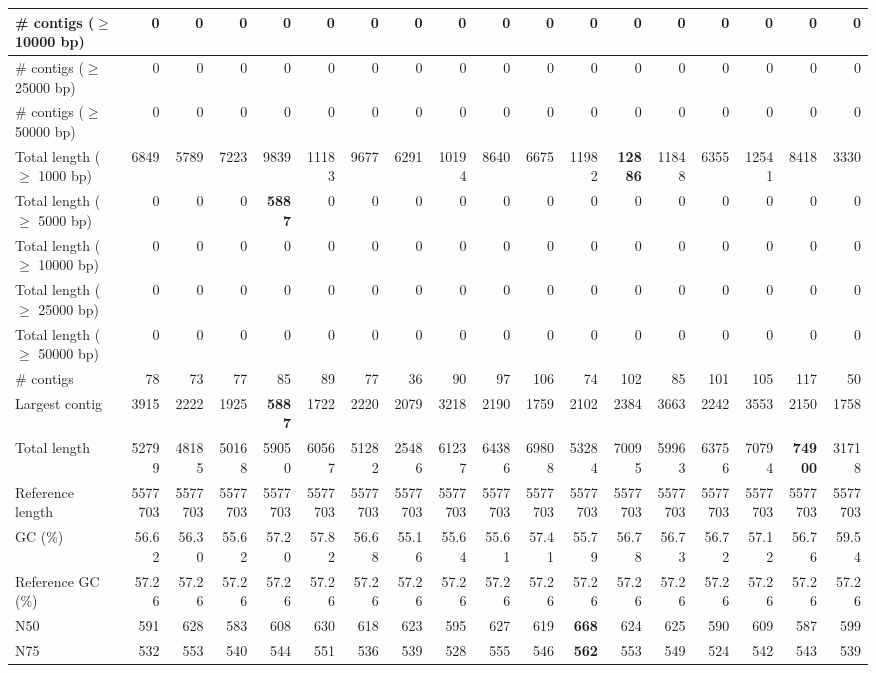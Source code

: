 \documentclass[12pt,a4paper]{article}
\begin{document}
\begin{table}[ht]
\begin{center}
\begin{tabular}{|l*{17}{|r}|}
\# contigs ($\geq$ 10000 bp) & 0 & 0 & 0 & 0 & 0 & 0 & 0 & 0 & 0 & 0 & 0 & 0 & 0 & 0 & 0 & 0 & 0 \\ \hline
\# contigs ($\geq$ 25000 bp) & 0 & 0 & 0 & 0 & 0 & 0 & 0 & 0 & 0 & 0 & 0 & 0 & 0 & 0 & 0 & 0 & 0 \\ \hline
\# contigs ($\geq$ 50000 bp) & 0 & 0 & 0 & 0 & 0 & 0 & 0 & 0 & 0 & 0 & 0 & 0 & 0 & 0 & 0 & 0 & 0 \\ \hline
Total length ($\geq$ 1000 bp) & 6849 & 5789 & 7223 & 9839 & 11183 & 9677 & 6291 & 10194 & 8640 & 6675 & 11982 & {\bf 12886} & 11848 & 6355 & 12541 & 8418 & 3330 \\ \hline
Total length ($\geq$ 5000 bp) & 0 & 0 & 0 & {\bf 5887} & 0 & 0 & 0 & 0 & 0 & 0 & 0 & 0 & 0 & 0 & 0 & 0 & 0 \\ \hline
Total length ($\geq$ 10000 bp) & 0 & 0 & 0 & 0 & 0 & 0 & 0 & 0 & 0 & 0 & 0 & 0 & 0 & 0 & 0 & 0 & 0 \\ \hline
Total length ($\geq$ 25000 bp) & 0 & 0 & 0 & 0 & 0 & 0 & 0 & 0 & 0 & 0 & 0 & 0 & 0 & 0 & 0 & 0 & 0 \\ \hline
Total length ($\geq$ 50000 bp) & 0 & 0 & 0 & 0 & 0 & 0 & 0 & 0 & 0 & 0 & 0 & 0 & 0 & 0 & 0 & 0 & 0 \\ \hline
\# contigs & 78 & 73 & 77 & 85 & 89 & 77 & 36 & 90 & 97 & 106 & 74 & 102 & 85 & 101 & 105 & 117 & 50 \\ \hline
Largest contig & 3915 & 2222 & 1925 & {\bf 5887} & 1722 & 2220 & 2079 & 3218 & 2190 & 1759 & 2102 & 2384 & 3663 & 2242 & 3553 & 2150 & 1758 \\ \hline
Total length & 52799 & 48185 & 50168 & 59050 & 60567 & 51282 & 25486 & 61237 & 64386 & 69808 & 53284 & 70095 & 59963 & 63756 & 70794 & {\bf 74900} & 31718 \\ \hline
Reference length & 5577703 & 5577703 & 5577703 & 5577703 & 5577703 & 5577703 & 5577703 & 5577703 & 5577703 & 5577703 & 5577703 & 5577703 & 5577703 & 5577703 & 5577703 & 5577703 & 5577703 \\ \hline
GC (\%) & 56.62 & 56.30 & 55.62 & 57.20 & 57.82 & 56.68 & 55.16 & 55.64 & 55.61 & 57.41 & 55.79 & 56.78 & 56.73 & 56.72 & 57.12 & 56.76 & 59.54 \\ \hline
Reference GC (\%) & 57.26 & 57.26 & 57.26 & 57.26 & 57.26 & 57.26 & 57.26 & 57.26 & 57.26 & 57.26 & 57.26 & 57.26 & 57.26 & 57.26 & 57.26 & 57.26 & 57.26 \\ \hline
N50 & 591 & 628 & 583 & 608 & 630 & 618 & 623 & 595 & 627 & 619 & {\bf 668} & 624 & 625 & 590 & 609 & 587 & 599 \\ \hline
N75 & 532 & 553 & 540 & 544 & 551 & 536 & 539 & 528 & 555 & 546 & {\bf 562} & 553 & 549 & 524 & 542 & 543 & 539 \\ \hline

\end{tabular}
\end{center}
\end{table}
\end{document}
